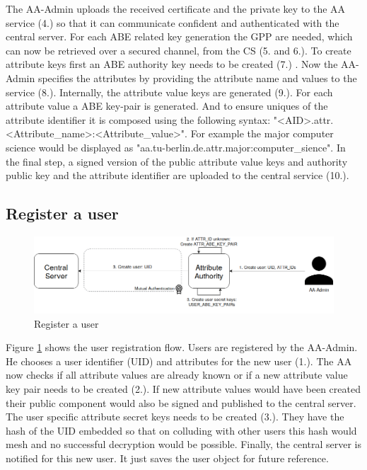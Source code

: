 The AA-Admin uploads the received certificate and the private key to the AA service (4.) so that it can communicate confident and authenticated with the central server. For each ABE related key generation the GPP are needed, which can now be retrieved over a secured channel, from the CS (5. and 6.). To create attribute keys first an ABE authority key needs to be created (7.) . Now the AA-Admin specifies the attributes by providing the attribute name and values to the service (8.). Internally, the attribute value keys are generated (9.). For each attribute value a ABE key-pair is generated. And to ensure uniques of the attribute identifier it is composed using the following syntax: "<AID>.attr.<Attribute\_name>:<Attribute\_value>". For example the major computer science would be displayed as "aa.tu-berlin.de.attr.major:computer\_sience". In the final step, a signed version of the public attribute value keys and authority public key and the attribute identifier are uploaded to the central service (10.).

\subsection{Register a user}
\begin{figure}[!h]
\centering
    \includegraphics[width=\linewidth]{img/user_register.png}
    \caption{Register a user}
    \label{fig:user-register}
\end{figure}
Figure \ref{fig:user-register} shows the user registration flow. Users are registered by the AA-Admin. He chooses a user identifier (UID) and attributes for the new user (1.).  The AA now checks if all attribute values are already known or if a new attribute value key pair needs to be created (2.). If new attribute values would have been created their public component would also be signed and published to the central server. The user specific attribute secret keys needs to be created (3.). They have the hash of the UID embedded so that on colluding with other users this hash would mesh and no successful decryption would be possible. Finally, the central server is notified for this new user. It just saves the user object for future reference.

